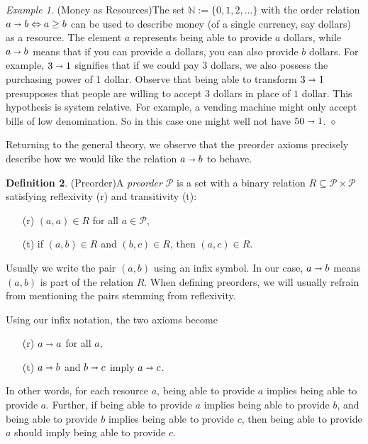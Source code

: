 \documentclass[12pt]{article}
\theoremstyle{definition}
\newtheorem{definition}{Definition}[section]
\theoremstyle{plain}
\theoremstyle{plain}
\theoremstyle{plain}
\theoremstyle{plain}
\theoremstyle{remark}
\newtheorem{example}[definition]{Example}
\newcommand\xqed[1]{%
	\leavevmode\unskip\penalty9999 \hbox{}\nobreak\hfill
	\quad\hbox{#1}}
\newcommand\exampleend{\xqed{$\diamond$}}
\theoremstyle{remark}
\newcommand{\mc}[1]{\mathcal{#1}}
\newcommand{\sub}{\subseteq}
\begin{document}
\begin{example}(Money as Resources)\label{ex:money}
	The set $\mathbb{N} := \{0,1,2,\ldots \}$ with the order relation $a \shortrightarrow b \Leftrightarrow a \geq b$ can be used to describe money (of a single currency, say dollars) as a resource. The element $a$ represents being able to provide $a$ dollars, while $a \shortrightarrow b$ means that if you can provide $a$ dollars, you can also provide $b$ dollars. For example, $3 \shortrightarrow 1$ signifies that if we could pay 3 dollars, we also possess the purchasing power of 1 dollar. Observe that being able to transform $3 \shortrightarrow 1$ presupposes that people are willing to accept $3$ dollars in place of $1$ dollar. This hypothesis is system relative. For example, a vending machine might only accept bills of low denomination. So in this case one might well not have $50 \shortrightarrow 1$. \exampleend
\end{example}

Returning to the general theory, we observe that the preorder axioms precisely describe how we would like the relation $a \shortrightarrow b$ to behave.

\begin{definition}(Preorder)\label{def:preorder}
	A \emph{preorder} $\mc{P}$ is a set with a binary relation $R \sub \mc{P} \times \mc{P}$ satisfying reflexivity (r) and transitivity (t):
	\begin{itemize}
		\item[(r)] $(a,a) \in R$ for all $a \in \mc{P}$,
		\item[(t)] if $(a,b) \in R$ and $(b,c) \in R$, then $(a,c) \in R$.
	\end{itemize}
	Usually we write the pair $(a,b)$ using an infix symbol. In our case, $a \shortrightarrow b$ means $(a,b)$ is part of the relation $R$. When defining preorders, we will usually refrain from mentioning the pairs stemming from reflexivity.
\end{definition}

Using our infix notation, the two axioms become 
\begin{itemize}
	\item[(r)] $a \shortrightarrow a$ for all $a$,
	\item[(t)] $a \shortrightarrow b$ and $b \shortrightarrow c$ imply $a \shortrightarrow c$.
\end{itemize}  
In other words, for each resource $a$, being able to provide $a$ implies being able to provide $a$. Further, if being able to provide $a$ implies being able to provide $b$, and being able to provide $b$ implies being able to provide $c$, then being able to provide $a$ should imply being able to provide $c$. \\
\end{document}
